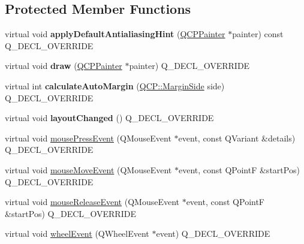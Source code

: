 \subsection*{Protected Member Functions}
\begin{DoxyCompactItemize}
\item 
\mbox{\label{class_q_c_p_axis_rect_a4a318008e2b7f881a14c3d97186b31f9}} 
virtual void {\bfseries apply\+Default\+Antialiasing\+Hint} (\hyperlink{class_q_c_p_painter}{Q\+C\+P\+Painter} $\ast$painter) const Q\+\_\+\+D\+E\+C\+L\+\_\+\+O\+V\+E\+R\+R\+I\+DE
\item 
\mbox{\label{class_q_c_p_axis_rect_af710c50530e370539a4439d6c4db9090}} 
virtual void {\bfseries draw} (\hyperlink{class_q_c_p_painter}{Q\+C\+P\+Painter} $\ast$painter) Q\+\_\+\+D\+E\+C\+L\+\_\+\+O\+V\+E\+R\+R\+I\+DE
\item 
\mbox{\label{class_q_c_p_axis_rect_ac51055d83f5f414b6d013d3a24b0a941}} 
virtual int {\bfseries calculate\+Auto\+Margin} (\hyperlink{namespace_q_c_p_a7e487e3e2ccb62ab7771065bab7cae54}{Q\+C\+P\+::\+Margin\+Side} side) Q\+\_\+\+D\+E\+C\+L\+\_\+\+O\+V\+E\+R\+R\+I\+DE
\item 
\mbox{\label{class_q_c_p_axis_rect_a575e38ac71a21906dc2d7b3364db2d62}} 
virtual void {\bfseries layout\+Changed} () Q\+\_\+\+D\+E\+C\+L\+\_\+\+O\+V\+E\+R\+R\+I\+DE
\item 
virtual void \hyperlink{class_q_c_p_axis_rect_aa9a7c807eaa4666870ac94aa6abc4dde}{mouse\+Press\+Event} (Q\+Mouse\+Event $\ast$event, const Q\+Variant \&details) Q\+\_\+\+D\+E\+C\+L\+\_\+\+O\+V\+E\+R\+R\+I\+DE
\item 
virtual void \hyperlink{class_q_c_p_axis_rect_a9cd27ad8c5cfb49aefd9dbb30def4beb}{mouse\+Move\+Event} (Q\+Mouse\+Event $\ast$event, const Q\+PointF \&start\+Pos) Q\+\_\+\+D\+E\+C\+L\+\_\+\+O\+V\+E\+R\+R\+I\+DE
\item 
virtual void \hyperlink{class_q_c_p_axis_rect_a6c89b988d3a0b93c0878f0ebdb5037f4}{mouse\+Release\+Event} (Q\+Mouse\+Event $\ast$event, const Q\+PointF \&start\+Pos) Q\+\_\+\+D\+E\+C\+L\+\_\+\+O\+V\+E\+R\+R\+I\+DE
\item 
virtual void \hyperlink{class_q_c_p_axis_rect_a93eeaa0c127d6d6fe8171b2455080262}{wheel\+Event} (Q\+Wheel\+Event $\ast$event) Q\+\_\+\+D\+E\+C\+L\+\_\+\+O\+V\+E\+R\+R\+I\+DE

\end{DoxyCompactItemize}
